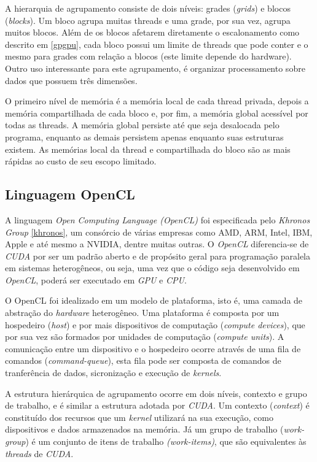   A hierarquia de agrupamento consiste de dois níveis: grades (\textit{grids}) e blocos (\textit{blocks}). Um bloco agrupa muitas threads e uma grade, por sua vez, agrupa muitos blocos. Além de os blocos afetarem diretamente o escalonamento como descrito em \ref{gpgpu}, cada bloco possui um limite de threads que pode conter e o mesmo para grades com relação a blocos (este limite depende do hardware). Outro uso interessante para este agrupamento, é organizar processamento sobre dados que possuem três dimensões.
  
  O primeiro nível de memória é a memória local de cada thread privada, depois a memória compartilhada de cada bloco e, por fim, a memória global acessível por todas as threads. A memória global persiste até que seja desalocada pelo programa, enquanto as demais persistem apenas enquanto suas estruturas existem. As memórias local da thread e compartilhada do bloco são as mais rápidas ao custo de seu escopo limitado.
    
  \subsection{Linguagem OpenCL}
  A linguagem \textit{Open Computing Language (OpenCL)} foi especificada pelo \textit{Khronos Group} \ref{khronos}, um consórcio de várias empresas como AMD, ARM, Intel, IBM, Apple e até mesmo a NVIDIA, dentre muitas outras. O \textit{OpenCL} diferencia-se de \textit{CUDA} por ser um padrão aberto e de propósito geral para programação paralela em sistemas heterogêneos, ou seja, uma vez que o código seja desenvolvido em \textit{OpenCL}, poderá ser executado em \textit{GPU} e \textit{CPU}.

  O OpenCL foi idealizado em um modelo de plataforma, isto é, uma camada de abstração do \textit{hardware} heterogêneo. Uma plataforma é composta por um hospedeiro (\textit{host}) e por mais dispositivos de computação (\textit{compute devices}), que por sua vez são formados por unidades de computação (\textit{compute units}). A comunicação entre um dispositivo e o hospedeiro ocorre através de uma fila de comandos (\textit{command-queue}), esta fila pode ser composta de comandos de tranferência de dados, sicronização e execução de \textit{kernels}.

  A estrutura hierárquica de agrupamento ocorre em dois níveis, contexto e grupo de trabalho, e é similar a estrutura adotada por \textit{CUDA}. Um contexto (\textit{context}) é constituído dos recursos que um \textit{kernel} utilizará na sua execução, como dispositivos e dados armazenados na memória. Já um grupo de trabalho (\textit{work-group}) é um conjunto de itens de trabalho \textit{(work-items)}, que são equivalentes às \textit{threads} de \textit{CUDA}.


